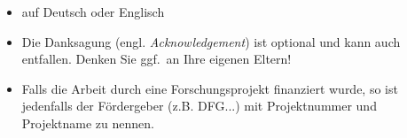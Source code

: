 \documentclass[a4paper,11pt,bibliography=totoc,listof=totoc,headinclude=true,cleardoublepage=empty,oneside]{scrbook}
\begin{document}
{\color{change}
\begin{itemize}
\item auf Deutsch oder Englisch
\item Die Danksagung (engl. {\em Acknowledgement}) ist optional und kann auch entfallen. Denken Sie ggf.\ an Ihre eigenen Eltern!

\item Falls die Arbeit durch eine Forschungsprojekt finanziert wurde, so ist jedenfalls der Fördergeber (z.B. DFG...) mit Projektnummer und Projektname zu nennen.

\end{itemize}
}

\cleardoublepage








\end{document}
